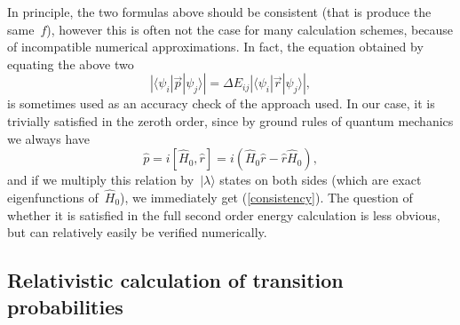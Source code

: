 In principle, the two formulas above should be consistent (that is produce the same~$f$), however this is often not the case for many calculation schemes, because of incompatible numerical approximations. In fact, the equation obtained by equating the above two
\begin{equation} \label{consistency}
|\langle \psi_i|\vec{p}|\psi_j \rangle| = \Delta E_{i j} |\langle \psi_i|\vec{r}|\psi_j \rangle|,
\end{equation}
is sometimes used as an accuracy check of the approach used. In our case, it is trivially satisfied in the zeroth order, since by ground rules of quantum mechanics we always have
\begin{equation}
\widehat{p} = i [\widehat{H}_0,\widehat{r}] = i (\widehat{H}_0 \widehat{r} - \widehat{r} \widehat{H}_0),
\end{equation}
and if we multiply this relation by~$| \lambda \rangle$ states on both sides (which are exact eigenfunctions of~$\widehat{H}_0$), we immediately get (\ref{consistency}). The question of whether it is satisfied in the full second order energy calculation is less obvious, but can relatively easily be verified numerically.

\subsection{Relativistic calculation of transition probabilities}

